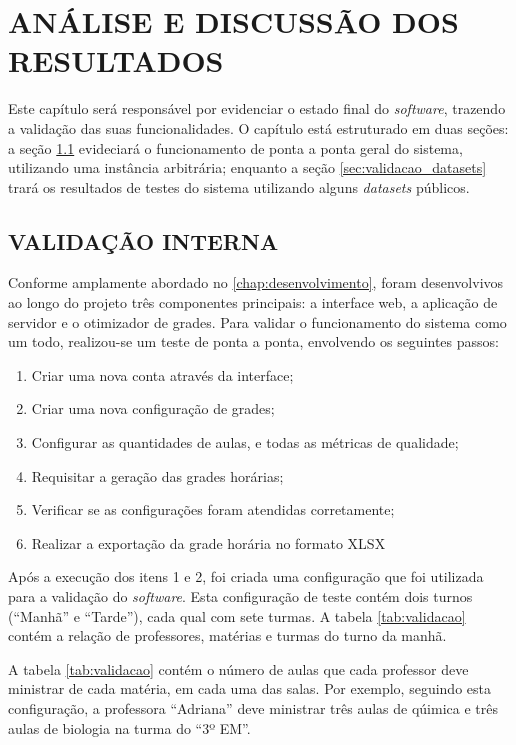 
\chapter{ANÁLISE E DISCUSSÃO DOS RESULTADOS}
\label{chap:resultados}

Este capítulo será responsável por evidenciar o estado final do \textit{software}, trazendo a validação das suas funcionalidades. O capítulo está estruturado em duas seções: a seção \ref{sec:validacao_geral} evideciará o funcionamento de ponta a ponta geral do sistema, utilizando uma instância arbitrária; enquanto a seção \ref{sec:validacao_datasets} trará os resultados de testes do sistema utilizando alguns \textit{datasets} públicos.

\section{VALIDAÇÃO INTERNA}
\label{sec:validacao_geral}

Conforme amplamente abordado no \autoref{chap:desenvolvimento}, foram desenvolvivos ao longo do projeto três componentes principais: a interface web, a aplicação de servidor e o otimizador de grades. Para validar o funcionamento do sistema como um todo, realizou-se um teste de ponta a ponta, envolvendo os seguintes passos:

\begin{enumerate}
	\item Criar uma nova conta através da interface;
	\item Criar uma nova configuração de grades;
	\item Configurar as quantidades de aulas, e todas as métricas de qualidade;
	\item Requisitar a geração das grades horárias;
	\item Verificar se as configurações foram atendidas corretamente;
	\item Realizar a exportação da grade horária no formato XLSX
\end{enumerate}

Após a execução dos itens 1 e 2, foi criada uma configuração que foi utilizada para a validação do \textit{software}. Esta configuração de teste contém dois turnos (``Manhã'' e ``Tarde''), cada qual com sete turmas. A tabela \ref{tab:validacao} contém a relação de professores, matérias e turmas do turno da manhã. 

A tabela \ref{tab:validacao} contém o número de aulas que cada professor deve ministrar de cada matéria, em cada uma das salas. Por exemplo, seguindo esta configuração, a professora ``Adriana'' deve ministrar três aulas de qúimica e três aulas de biologia na turma do ``3º EM''.

